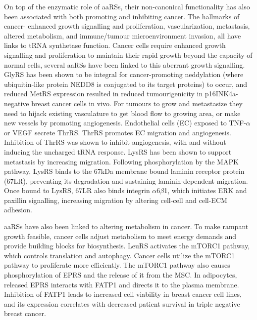 On top of the enzymatic role of aaRSs, their non-canonical functionality has also been associated with both promoting and inhibiting cancer.
The hallmarks of cancer- enhanced growth signalling and proliferation, vascularization, metastasis, altered metabolism, and immune/tumour microenvironment invasion, all have links to tRNA synthetase function.
Cancer cells require enhanced growth signalling and proliferation to maintain their rapid growth beyond the capacity of normal cells, several aaRSs have been linked to this aberrant growth signalling.
GlyRS has been shown to be integral for cancer-promoting neddylation (where ubiquitin-like protein NEDD8 is conjugated to its target proteins) to occur, and reduced MetRS expression resulted in reduced tumourigenicity in p16INK4a-negative breast cancer cells in vivo\cite{mo2016neddylation, deng2020role, kwon2018stabilization}.
For tumours to grow and metastasize they need to hijack existing vasculature to get blood flow to growing area, or make new vessels by promoting angiogenesis.
Endothelial cells (EC) exposed to TNF-$\alpha$ or VEGF secrete ThrRS.
ThrRS promotes EC migration and angiogenesis.
Inhibition of ThrRS was shown to inhibit angiogenesis, with and without inducing the uncharged tRNA response\cite{williams2013secreted, mirando2015aminoacyl}.
LysRS has been shown to support metastasis by increasing migration.
Following phosphorylation by the MAPK pathway, LysRS binds to the 67kDa membrane bound laminin receptor protein (67LR), preventing its degradation and sustaining laminin-dependent migration.
Once bound to LysRS, 67LR also binds integrin $\alpha$6$\beta$1, which initiates ERK and paxillin signalling, increasing migration by altering cell-cell and cell-ECM adhesion.

aaRSs have also been linked to altering metabolism in cancer.
To make rampant growth feasible, cancer cells adjust metabolism to meet energy demands and provide building blocks for biosynthesis.
LeuRS activates the mTORC1 pathway, which controls translation and autophagy.
Cancer cells utilize the mTORC1 pathway to proliferate more efficiently.
The mTORC1 pathway also causes phosphorylation of EPRS and the release of it from the MSC.
In adipocytes, released EPRS interacts with FATP1 and directs it to the plasma membrane.
Inhibition of FATP1 leads to increased cell viability in breast cancer cell lines, and its expression correlates with decreased patient survival in triple negative breast cancer\cite{mendes2019unraveling}.

